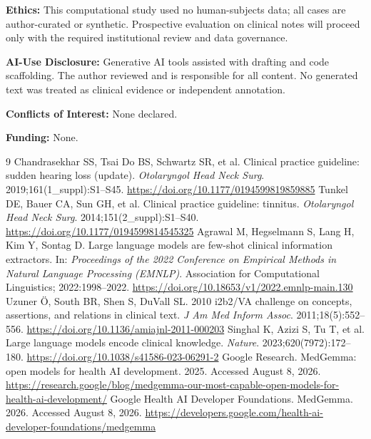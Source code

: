 \documentclass[11pt]{article}
\begin{document}
\noindent\textbf{Ethics:} This computational study used no human-subjects data; all cases are author-curated or synthetic. Prospective evaluation on clinical notes will proceed only with the required institutional review and data governance.

\noindent\textbf{AI-Use Disclosure:} Generative AI tools assisted with drafting and code scaffolding. The author reviewed and is responsible for all content. No generated text was treated as clinical evidence or independent annotation.

\noindent\textbf{Conflicts of Interest:} None declared.

\noindent\textbf{Funding:} None.

\begin{thebibliography}{9}
 Chandrasekhar SS, Tsai Do BS, Schwartz SR, et al. Clinical practice guideline: sudden hearing loss (update). \textit{Otolaryngol Head Neck Surg}. 2019;161(1\_suppl):S1--S45. \url{https://doi.org/10.1177/0194599819859885}
 Tunkel DE, Bauer CA, Sun GH, et al. Clinical practice guideline: tinnitus. \textit{Otolaryngol Head Neck Surg}. 2014;151(2\_suppl):S1--S40. \url{https://doi.org/10.1177/0194599814545325}
 Agrawal M, Hegselmann S, Lang H, Kim Y, Sontag D. Large language models are few-shot clinical information extractors. In: \textit{Proceedings of the 2022 Conference on Empirical Methods in Natural Language Processing (EMNLP)}. Association for Computational Linguistics; 2022:1998--2022. \url{https://doi.org/10.18653/v1/2022.emnlp-main.130}
 Uzuner \"{O}, South BR, Shen S, DuVall SL. 2010 i2b2/VA challenge on concepts, assertions, and relations in clinical text. \textit{J Am Med Inform Assoc}. 2011;18(5):552--556. \url{https://doi.org/10.1136/amiajnl-2011-000203}
 Singhal K, Azizi S, Tu T, et al. Large language models encode clinical knowledge. \textit{Nature}. 2023;620(7972):172--180. \url{https://doi.org/10.1038/s41586-023-06291-2}
 Google Research. MedGemma: open models for health AI development. 2025. Accessed August 8, 2026. \url{https://research.google/blog/medgemma-our-most-capable-open-models-for-health-ai-development/}
 Google Health AI Developer Foundations. MedGemma. 2026. Accessed August 8, 2026. \url{https://developers.google.com/health-ai-developer-foundations/medgemma}

\end{thebibliography}
\end{document}
